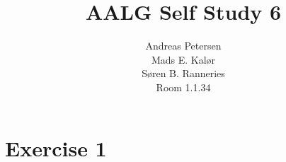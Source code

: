 \documentclass[koma,a4paper]{article}
\title{AALG Self Study 6}
\author{Andreas Petersen\\
Mads E. Kalør\\
Søren B. Ranneries\\
Room 1.1.34}
\begin{document}
\maketitle

\pagebreak

\section{Exercise 1}
\end{document}
